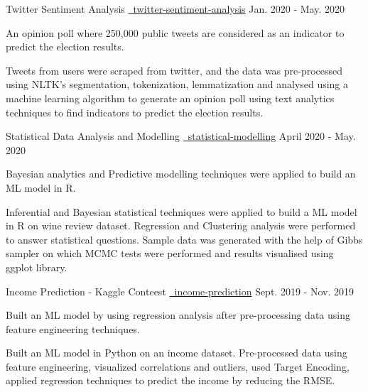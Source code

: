 \begin{cventries}
{\begin{cvitems}
{      }
      \end{cvitems}
    }
  \cvproject
    {Twitter Sentiment Analysis}
    {
    {}
    {\href{https://github.com/mukeshmk/twitter-sentiment-analysis}{\faGithubSquare\ twitter-sentiment-analysis}}
    }
    {Jan. 2020 - May. 2020}
    {
      \begin{cvitems}
      \vspace{-0.5ex}
      {
      \item {An opinion poll where 250,000 public tweets are considered as an indicator to predict the election results.}
      }
      {
      Tweets from users were scraped from twitter, and the data was pre-processed using NLTK's segmentation, tokenization, lemmatization and analysed using a machine learning algorithm to generate an opinion poll using text analytics techniques to find indicators to predict the election results.
      }
      \end{cvitems}
    }
  \cvproject
    {Statistical Data Analysis and Modelling}
    {
    {}
    {\href{https://github.com/mukeshmk/statistical-modelling}{\faGithubSquare\ statistical-modelling}}
    }
    {April 2020 - May. 2020}
    {
      \begin{cvitems}
      \vspace{-0.5ex}
      {
      \item {}Bayesian analytics and Predictive modelling techniques were applied to build an ML model in R.}
      {
      Inferential and Bayesian statistical techniques were applied to build a ML model in R on wine review dataset. Regression and Clustering analysis were performed to answer statistical questions. Sample data was generated with the help of Gibbs sampler on which MCMC tests were performed and results visualised using ggplot library.
      }
      \end{cvitems}
    }
  \cvproject
    {Income Prediction - Kaggle Conteest}
    {
    {}
    {\href{https://github.com/mukeshmk/tcdml1920-income-ind}{\faGithubSquare\ income-prediction}}
    }
    {Sept. 2019 - Nov. 2019}
    {
      \begin{cvitems}
      \vspace{-0.5ex}
      {
      \item {Built an ML model by using regression analysis after pre-processing data using feature engineering techniques.}
      }
      {
      Built an ML model in Python on an income dataset. Pre-processed data using feature engineering, visualized correlations and outliers, used Target Encoding, applied regression techniques to predict the income by reducing the RMSE.
      }
      \end{cvitems}
    }


\end{cventries}
